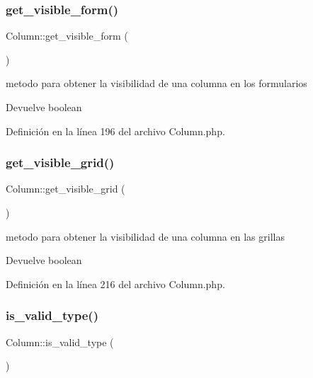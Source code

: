 \subsubsection{\texorpdfstring{get\_visible\_form()}{get\_visible\_form()}}
{\footnotesize\ttfamily Column\+::get\+\_\+visible\+\_\+form (\begin{DoxyParamCaption}{ }\end{DoxyParamCaption})}

metodo para obtener la visibilidad de una columna en los formularios

\begin{DoxyReturn}{Devuelve}
boolean 
\end{DoxyReturn}


Definición en la línea 196 del archivo Column.\+php.

\mbox{\label{class_column_a1ebf50eb00d5c65b0087cf13c1ceb8fd}} 
\subsubsection{\texorpdfstring{get\_visible\_grid()}{get\_visible\_grid()}}
{\footnotesize\ttfamily Column\+::get\+\_\+visible\+\_\+grid (\begin{DoxyParamCaption}{ }\end{DoxyParamCaption})}

metodo para obtener la visibilidad de una columna en las grillas

\begin{DoxyReturn}{Devuelve}
boolean 
\end{DoxyReturn}


Definición en la línea 216 del archivo Column.\+php.

\mbox{\label{class_column_a585cfab5cbfb826d564eeecd7fc462a7}} 
\subsubsection{\texorpdfstring{is\_valid\_type()}{is\_valid\_type()}}
{\footnotesize\ttfamily Column\+::is\+\_\+valid\+\_\+type (\begin{DoxyParamCaption}{ }\end{DoxyParamCaption})}

